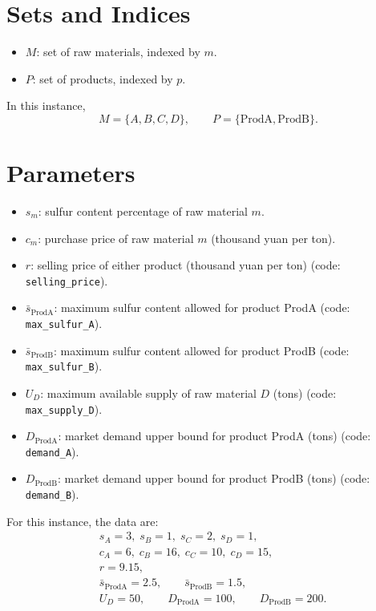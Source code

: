\section*{Sets and Indices}

\begin{itemize}
    \item $M$: set of raw materials, indexed by $m$.
    \item $P$: set of products, indexed by $p$.
\end{itemize}

In this instance,
\[
M=\{A,B,C,D\}, \qquad P=\{\text{ProdA},\text{ProdB}\}.
\]

\section*{Parameters}

\begin{itemize}
    \item $s_m$: sulfur content percentage of raw material $m$.
    \item $c_m$: purchase price of raw material $m$ (thousand yuan per ton).
    \item $r$: selling price of either product (thousand yuan per ton) (code: \texttt{selling\_price}).
    \item $\bar{s}_{\text{ProdA}}$: maximum sulfur content allowed for product ProdA (code: \texttt{max\_sulfur\_A}).
    \item $\bar{s}_{\text{ProdB}}$: maximum sulfur content allowed for product ProdB (code: \texttt{max\_sulfur\_B}).
    \item $U_D$: maximum available supply of raw material $D$ (tons) (code: \texttt{max\_supply\_D}).
    \item $D_{\text{ProdA}}$: market demand upper bound for product ProdA (tons) (code: \texttt{demand\_A}).
    \item $D_{\text{ProdB}}$: market demand upper bound for product ProdB (tons) (code: \texttt{demand\_B}).
\end{itemize}

For this instance, the data are:
\[
\begin{aligned}
&s_A=3,\; s_B=1,\; s_C=2,\; s_D=1,\\
&c_A=6,\; c_B=16,\; c_C=10,\; c_D=15,\\
&r=9.15,\\
&\bar{s}_{\text{ProdA}}=2.5,\qquad \bar{s}_{\text{ProdB}}=1.5,\\
&U_D=50,\qquad D_{\text{ProdA}}=100,\qquad D_{\text{ProdB}}=200.
\end{aligned}
\]

